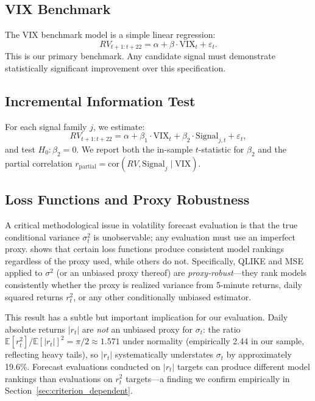 \documentclass[12pt,a4paper]{article}
\begin{document}
\subsection{VIX Benchmark}

The VIX benchmark model is a simple linear regression:
\begin{equation}
RV_{t+1:t+22} = \alpha + \beta \cdot \text{VIX}_t + \varepsilon_t.
\label{eq:vix_benchmark}
\end{equation}
This is our primary benchmark. Any candidate signal must demonstrate statistically significant improvement over this specification.

\subsection{Incremental Information Test}

For each signal family $j$, we estimate:
\begin{equation}
RV_{t+1:t+22} = \alpha + \beta_1 \cdot \text{VIX}_t + \beta_2 \cdot \text{Signal}_{j,t} + \varepsilon_t,
\label{eq:incremental}
\end{equation}
and test $H_0: \beta_2 = 0$. We report both the in-sample $t$-statistic for $\beta_2$ and the partial correlation $r_{\text{partial}} = \text{cor}(RV, \text{Signal}_j \mid \text{VIX})$.

\subsection{Loss Functions and Proxy Robustness}
\label{sec:loss_functions}

A critical methodological issue in volatility forecast evaluation is that the true conditional variance $\sigma^2_t$ is unobservable; any evaluation must use an imperfect proxy. \citet{patton2011} shows that certain loss functions produce consistent model rankings regardless of the proxy used, while others do not. Specifically, QLIKE and MSE applied to $\sigma^2$ (or an unbiased proxy thereof) are \emph{proxy-robust}---they rank models consistently whether the proxy is realized variance from 5-minute returns, daily squared returns $r_t^2$, or any other conditionally unbiased estimator.

This result has a subtle but important implication for our evaluation. Daily absolute returns $|r_t|$ are \emph{not} an unbiased proxy for $\sigma_t$: the ratio $\mathbb{E}[r_t^2]/\mathbb{E}[|r_t|]^2 = \pi/2 \approx 1.571$ under normality (empirically 2.44 in our sample, reflecting heavy tails), so $|r_t|$ systematically understates $\sigma_t$ by approximately 19.6\%. Forecast evaluations conducted on $|r_t|$ targets can produce different model rankings than evaluations on $r_t^2$ targets---a finding we confirm empirically in Section~\ref{sec:criterion_dependent}.
\end{document}
